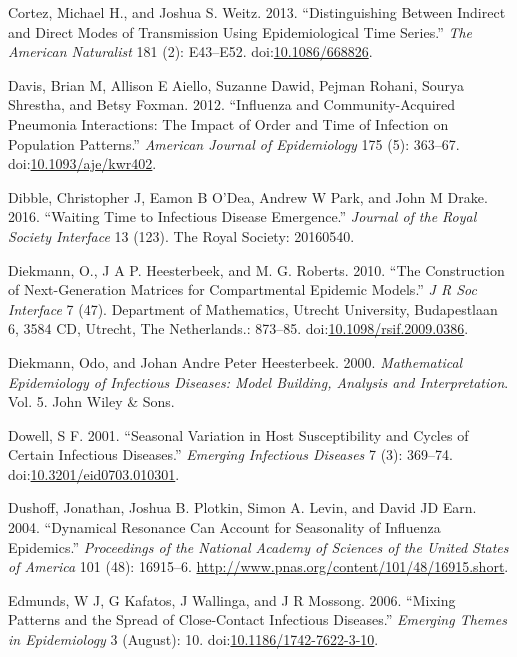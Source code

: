 \documentclass[]{article}
\theoremstyle{definition}
\theoremstyle{definition}
\theoremstyle{definition}
\theoremstyle{remark}
\begin{document}
\hypertarget{ref-cortez13}{}
Cortez, Michael H., and Joshua S. Weitz. 2013. ``Distinguishing Between
Indirect and Direct Modes of Transmission Using Epidemiological Time
Series.'' \emph{The American Naturalist} 181 (2): E43--E52.
doi:\href{https://doi.org/10.1086/668826}{10.1086/668826}.

\hypertarget{ref-davis12}{}
Davis, Brian M, Allison E Aiello, Suzanne Dawid, Pejman Rohani, Sourya
Shrestha, and Betsy Foxman. 2012. ``Influenza and Community-Acquired
Pneumonia Interactions: The Impact of Order and Time of Infection on
Population Patterns.'' \emph{American Journal of Epidemiology} 175 (5):
363--67.
doi:\href{https://doi.org/10.1093/aje/kwr402}{10.1093/aje/kwr402}.

\hypertarget{ref-dibble16}{}
Dibble, Christopher J, Eamon B O'Dea, Andrew W Park, and John M Drake.
2016. ``Waiting Time to Infectious Disease Emergence.'' \emph{Journal of
the Royal Society Interface} 13 (123). The Royal Society: 20160540.

\hypertarget{ref-diekmann10}{}
Diekmann, O., J A P. Heesterbeek, and M. G. Roberts. 2010. ``The
Construction of Next-Generation Matrices for Compartmental Epidemic
Models.'' \emph{J R Soc Interface} 7 (47). Department of Mathematics,
Utrecht University, Budapestlaan 6, 3584 CD, Utrecht, The Netherlands.:
873--85.
doi:\href{https://doi.org/10.1098/rsif.2009.0386}{10.1098/rsif.2009.0386}.

\hypertarget{ref-diekmann00}{}
Diekmann, Odo, and Johan Andre Peter Heesterbeek. 2000.
\emph{Mathematical Epidemiology of Infectious Diseases: Model Building,
Analysis and Interpretation}. Vol. 5. John Wiley \& Sons.

\hypertarget{ref-dowell01}{}
Dowell, S F. 2001. ``Seasonal Variation in Host Susceptibility and
Cycles of Certain Infectious Diseases.'' \emph{Emerging Infectious
Diseases} 7 (3): 369--74.
doi:\href{https://doi.org/10.3201/eid0703.010301}{10.3201/eid0703.010301}.

\hypertarget{ref-dushoff04}{}
Dushoff, Jonathan, Joshua B. Plotkin, Simon A. Levin, and David JD Earn.
2004. ``Dynamical Resonance Can Account for Seasonality of Influenza
Epidemics.'' \emph{Proceedings of the National Academy of Sciences of
the United States of America} 101 (48): 16915--6.
\url{http://www.pnas.org/content/101/48/16915.short}.

\hypertarget{ref-edmunds06}{}
Edmunds, W J, G Kafatos, J Wallinga, and J R Mossong. 2006. ``Mixing
Patterns and the Spread of Close-Contact Infectious Diseases.''
\emph{Emerging Themes in Epidemiology} 3 (August): 10.
doi:\href{https://doi.org/10.1186/1742-7622-3-10}{10.1186/1742-7622-3-10}.
\end{document}
